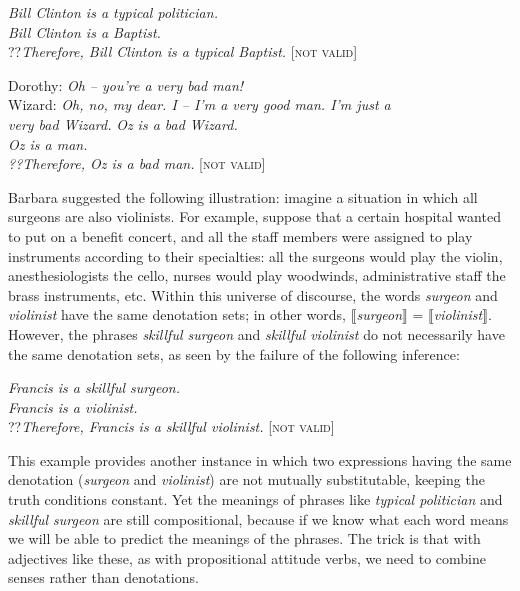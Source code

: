\ea \label{ex:15.6}
\textit{Bill Clinton is a typical politician.}\\
\textit{Bill Clinton is a Baptist.}\\\FelixHRule
??\textit{Therefore, Bill Clinton is a typical Baptist.} \hfill  [\textsc{not valid}]
\z

\ea \label{ex:15.7}
\ea  Dorothy: \textit{Oh – you’re a very bad man!}\\
Wizard: \textit{Oh, no, my dear. I – I’m a very good man. I’m just a \\
\hspace{1.2cm} very bad Wizard.} 
\ex  
  \textit{Oz is a bad Wizard.}\\
\textit{Oz is a man.\\
\FelixHRule
??Therefore, Oz is a bad man.}  \hfill [\textsc{not valid}]
\z \z


Barbara \citet{Partee1995} suggested the following illustration: imagine a situation in which all surgeons are also violinists. For example, suppose that a certain hospital wanted to put on a benefit concert, and all the staff members were assigned to play instruments according to their specialties: all the surgeons would play the violin, anesthesiologists the cello, nurses would play woodwinds, administrative staff the brass instruments, etc. Within this universe of discourse, the words \textit{surgeon} and \textit{violinist} have the same denotation sets; in other words, $\llbracket$\textit{surgeon}$\rrbracket$  = $\llbracket$\textit{violinist}$\rrbracket$. However, the phrases \textit{skillful surgeon} and \textit{skillful violinist} do not necessarily have the same denotation sets, as seen by the failure of the following inference:\largerpage


\ea \label{ex:15.8}
\textit{Francis is a skillful surgeon.}\\
\textit{Francis is a violinist.}\\
\FelixHRule
??\textit{Therefore, Francis is a skillful violinist.}  \hfill [\textsc{not valid}]
\z


This example provides another instance in which two expressions having the same denotation (\textit{surgeon} and \textit{violinist}) are not mutually substitutable, keeping the truth conditions constant. Yet the meanings of phrases like \textit{typical politician} and \textit{skillful surgeon} are still compositional, because if we know what each word means we will be able to predict the meanings of the phrases. The trick is that with adjectives like these, as with propositional attitude verbs, we need to combine senses rather than denotations.



